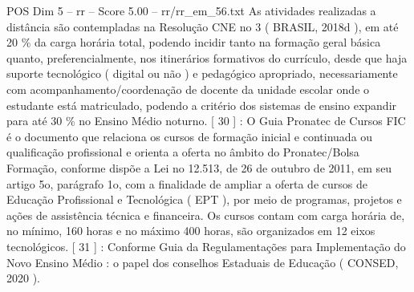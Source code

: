 \begin{textsample}{POS Dim 5 – rr – Score 5.00 – rr/rr\_em\_56.txt}
As atividades realizadas a distância são contempladas na Resolução CNE no 3 ( BRASIL, 2018d ), em até 20 \% da carga horária total, podendo incidir tanto na formação geral básica quanto, preferencialmente, nos itinerários formativos do currículo, desde que haja suporte tecnológico ( digital ou não ) e pedagógico apropriado, necessariamente com acompanhamento/coordenação de docente da unidade escolar onde o estudante está matriculado, podendo a critério dos sistemas de ensino expandir para até 30 \% no Ensino Médio noturno. [ 30 ] : O Guia Pronatec de Cursos FIC é o documento que relaciona os cursos de formação inicial e continuada ou qualificação profissional e orienta a oferta no âmbito do Pronatec/Bolsa Formação, conforme dispõe a Lei no 12.513, de 26 de outubro de 2011, em seu artigo 5o, parágrafo 1o, com a finalidade de ampliar a oferta de cursos de Educação Profissional e Tecnológica ( EPT ), por meio de programas, projetos e ações de assistência técnica e financeira.
Os cursos contam com carga horária de, no mínimo, 160 horas e no máximo 400 horas, são organizados em 12 eixos tecnológicos. [ 31 ] : Conforme Guia da Regulamentações para Implementação do Novo Ensino Médio : o papel dos conselhos Estaduais de Educação ( CONSED, 2020 ).

\end{textsample}
